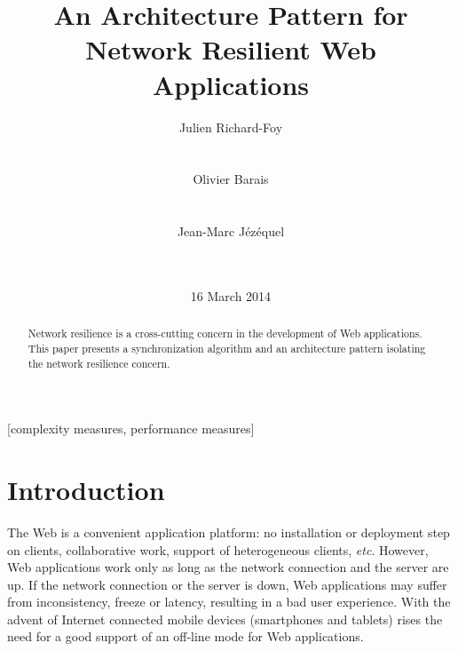 \documentclass{acm_proc_article-sp}
\begin{document}
\title{An Architecture Pattern for Network Resilient Web Applications}

\author{
\alignauthor
Julien Richard-Foy\\
       \\
       \\
\alignauthor
Olivier Barais\\
       \\
       \\
\alignauthor Jean-Marc Jézéquel\\
       \\
       \\
}
\date{16 March 2014}

\maketitle
\begin{abstract}
Network resilience is a cross-cutting concern in the development of Web applications. This paper presents a synchronization algorithm and an architecture pattern isolating the network resilience concern.
\end{abstract}

[complexity measures, performance measures]



\section{Introduction}

The Web is a convenient application platform: no installation or deployment step on clients, collaborative work, support of heterogeneous clients, \textit{etc}. However, Web applications work only as long as the network connection and the server are up. If the network connection or the server is down, Web applications may suffer from inconsistency, freeze or latency, resulting in a bad user experience. With the advent of Internet connected mobile devices (smartphones and tablets) rises the need for a good support of an off-line mode for Web applications.
\end{document}
